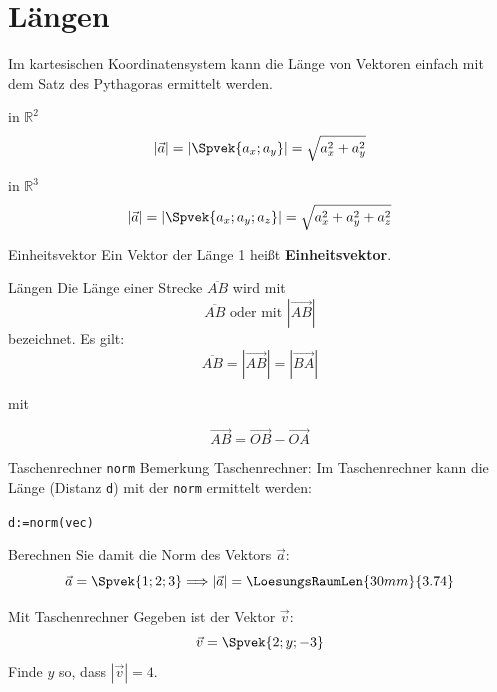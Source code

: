 \section{Längen}

Im kartesischen Koordinatensystem kann die Länge von Vektoren einfach
mit dem Satz des Pythagoras ermittelt werden.

\begin{gesetz}{in $\mathbb{R}^2$}{}
  $$|\vec{a}| = \left| \Spvek{a_x;a_y}  \right|   = \sqrt{a_x^2 + a_y^2}$$
\end{gesetz}

\begin{gesetz}{in $\mathbb{R}^3$}{}
  $$|\vec{a}| =  \left|\Spvek{a_x;a_y;a_z}\right| = \sqrt{a_x^2 + a_y^2 + a_z^2}$$
\end{gesetz}


\begin{definition}{Einheitsvektor}{}
  Ein Vektor der Länge 1 heißt \textbf{Einheitsvektor}.
\end{definition}

\begin{bemerkung}{Längen}{}
  Die Länge einer Strecke $\overline{AB}$ wird mit
  $$\overline{AB} \text{ oder mit } \left| \overrightarrow{AB} \right|$$
  bezeichnet. Es gilt:
  $$\overline{AB} = \left| \overrightarrow{AB} \right|  = \left| \overrightarrow{BA}\right|$$

  mit

  $$\overrightarrow{AB} = \overrightarrow{OB} - \overrightarrow{OA}$$
\end{bemerkung}

  

\newpage

\begin{bemerkung}{Taschenrechner \texttt{norm}}{}
Bemerkung Taschenrechner: Im Taschenrechner kann die Länge (Distanz
\texttt{d}) mit der \texttt{norm} ermittelt
werden:

\texttt{d:=norm(vec)}
\end{bemerkung}

Berechnen Sie damit die Norm des Vektors $\vec{a}$:
$$\vec{a} =\Spvek{1;2;3} \Longrightarrow \left| \vec{a} \right| = \LoesungsRaumLen{30mm}{3.74}$$

\begin{beispiel}{Mit Taschenrechner}{}
  Gegeben ist der Vektor $\vec{v}$:
$$\vec{v} = \Spvek{2;y;-3}$$
  Finde $y$ so, dass $|\vec{v}| = 4$.

  \TRAINER{\vspace{30mm}}
\end{beispiel}


